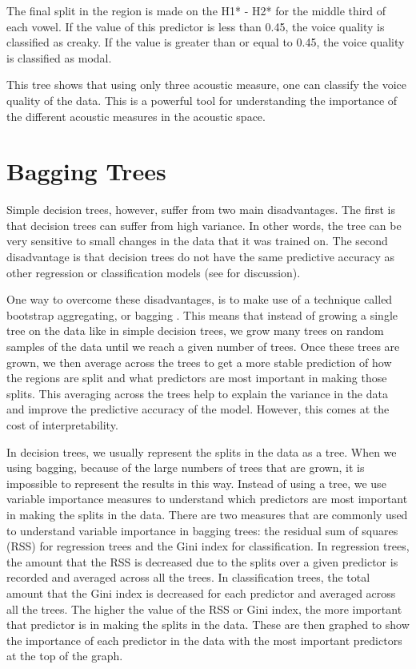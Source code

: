 The final split in the region is made on the H1* - H2* for the middle third of each vowel. If the value of this predictor is less than 0.45, the voice quality is classified as creaky. If the value is greater than or equal to 0.45, the voice quality is classified as modal.

This tree shows that using only three acoustic measure, one can classify the voice quality of the data. This is a powerful tool for understanding the importance of the different acoustic measures in the acoustic space. 

\section{Bagging Trees} \label{sec:bagging_bagging}

Simple decision trees, however, suffer from two main disadvantages. The first is that decision trees can suffer from high variance. In other words, the tree can be very sensitive to small changes in the data that it was trained on. The second disadvantage is that decision trees do not have the same predictive accuracy as other regression or classification models (see \cite{hastieElementsStatisticalLearning2009} for discussion).

One way to overcome these disadvantages, is to make use of a technique called bootstrap aggregating, or bagging \citep{breimanBaggingPredictors1996}. This means that instead of growing a single tree on the data like in simple decision trees, we grow many trees on random samples of the data until we reach a given number of trees. Once these trees are grown, we then average across the trees to get a more stable prediction of how the regions are split and what predictors are most important in making those splits. This averaging across the trees help to explain the variance in the data and improve the predictive accuracy of the model. However, this comes at the cost of interpretability. 

In decision trees, we usually represent the splits in the data as a tree. When we using bagging, because of the large numbers of trees that are grown, it is impossible to represent the results in this way. Instead of using a tree, we use variable importance measures to understand which predictors are most important in making the splits in the data. There are two measures that are commonly used to understand variable importance in bagging trees: the residual sum of squares (RSS) for regression trees and the Gini index for classification. In regression trees, the amount that the RSS is decreased due to the splits over a given predictor is recorded and averaged across all the trees. In classification trees, the total amount that the Gini index is decreased for each predictor and averaged across all the trees. The higher the value of the RSS or Gini index, the more important that predictor is in making the splits in the data. These are then graphed to show the importance of each predictor in the data with the most important predictors at the top of the graph.

